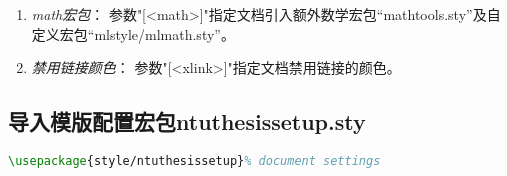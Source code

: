 \begin{enumerate}
\begin{lstlisting}[language=tex]
            \RequirePackage{enumitem}% configure the enumerate environment
            \setlist[enumerate]{wide=\parindent}% only indent the first line
            \setlist[itemize]{wide=\parindent}% only indent the first line
            \setlist{nosep}% default text spacing
            \RequirePackage{listings}% source code
            \RequirePackage{algpseudocode,algorithm,algorithmicx}% algorithm
            \providecommand{\algname}{Algorithm}%
            \def\ALG@name{\algname}% rename label
        \end{lstlisting}%
    \item \emph{math宏包}： 参数"[<math>]"指定文档引入额外数学宏包“mathtools.sty”及自定义宏包“mlstyle/mlmath.sty”。
    \item \emph{禁用链接颜色}： 参数"[<xlink>]"指定文档禁用链接的颜色。
\end{enumerate}




\subsection{导入模版配置宏包ntuthesissetup.sty}
\begin{lstlisting}[language=tex]
        \usepackage{style/ntuthesissetup}% document settings
 \end{lstlisting}%



 
